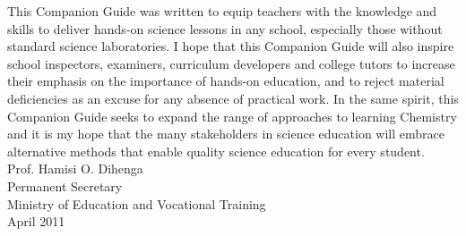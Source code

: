 This Companion Guide was written to equip teachers with the knowledge and skills to deliver hands-on science lessons in any school, especially those without standard science laboratories. I hope that this Companion Guide will also inspire school inspectors, examiners, curriculum developers and college tutors to increase their emphasis on the importance of hands-on education, and to reject material deficiencies as an excuse for any absence of practical work. In the same spirit, this Companion Guide seeks to expand the range of approaches to learning Chemistry and it is my hope that the many stakeholders in science education will embrace alternative methods that enable quality science education for every student.\\[14pt]
Prof. Hamisi O. Dihenga\\
Permanent Secretary\\
Ministry of Education and Vocational Training\\
April 2011
